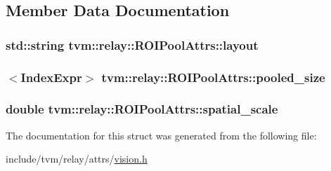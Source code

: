 \subsection{Member Data Documentation}
\subsubsection[{\texorpdfstring{layout}{layout}}]{\setlength{\rightskip}{0pt plus 5cm}std\+::string tvm\+::relay\+::\+R\+O\+I\+Pool\+Attrs\+::layout}\hypertarget{structtvm_1_1relay_1_1ROIPoolAttrs_ac77f024584d4e31435033d0a150bbde4}{}\label{structtvm_1_1relay_1_1ROIPoolAttrs_ac77f024584d4e31435033d0a150bbde4}
\subsubsection[{\texorpdfstring{pooled\+\_\+size}{pooled_size}}]{$<${\bf Index\+Expr}$>$ tvm\+::relay\+::\+R\+O\+I\+Pool\+Attrs\+::pooled\+\_\+size}\hypertarget{structtvm_1_1relay_1_1ROIPoolAttrs_a4ea18bc102c8431781f0bb8ff46e835f}{}\label{structtvm_1_1relay_1_1ROIPoolAttrs_a4ea18bc102c8431781f0bb8ff46e835f}
\subsubsection[{\texorpdfstring{spatial\+\_\+scale}{spatial_scale}}]{\setlength{\rightskip}{0pt plus 5cm}double tvm\+::relay\+::\+R\+O\+I\+Pool\+Attrs\+::spatial\+\_\+scale}\hypertarget{structtvm_1_1relay_1_1ROIPoolAttrs_ae51a330f9c855c0370bfb9c48ef6a977}{}\label{structtvm_1_1relay_1_1ROIPoolAttrs_ae51a330f9c855c0370bfb9c48ef6a977}


The documentation for this struct was generated from the following file\+:\begin{DoxyCompactItemize}
\item 
include/tvm/relay/attrs/\hyperlink{vision_8h}{vision.\+h}\end{DoxyCompactItemize}
